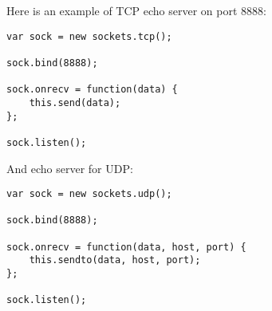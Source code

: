 Here is an example of TCP echo server on port 8888:

\begin{lstlisting}[basicstyle=\small,columns=fullflexible]
var sock = new sockets.tcp();

sock.bind(8888);

sock.onrecv = function(data) {
    this.send(data);
};

sock.listen();
\end{lstlisting}

And echo server for UDP:
\begin{lstlisting}[basicstyle=\small,columns=fullflexible]
var sock = new sockets.udp();

sock.bind(8888);

sock.onrecv = function(data, host, port) {
    this.sendto(data, host, port);
};

sock.listen();
\end{lstlisting}

